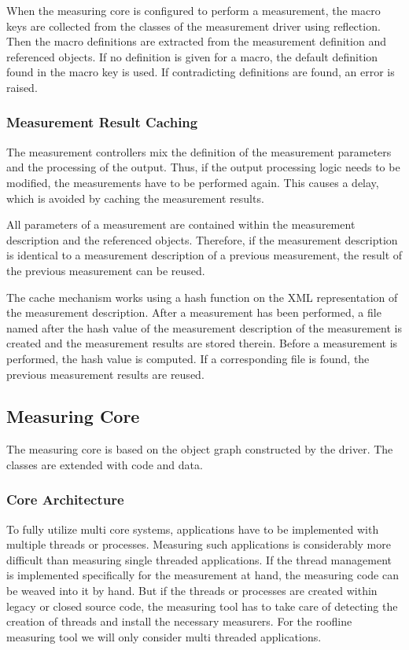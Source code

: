 \documentclass[a4paper,12pt]{article}
\newlength{\imgwidth}
\newcommand{\umlDiagram}[1]{%
	\settowidth{\imgwidth}{\texttt{[image: out/diagrams/\#1.pdf]}}%
	\setlength{\imgwidth}{\minof{0.5\imgwidth}{\textwidth}}%
	\par\vskip0.5cm\noindent\makebox[\textwidth][c]{%
	\texttt{[image: out/diagrams/\#1.pdf]}%
}\vskip0.5cm}
\begin{document}
When the measuring core is configured to perform a measurement, the macro keys
are collected from the classes of the measurement driver using reflection. Then
the macro definitions are extracted from the measurement definition and
referenced objects. If no definition is given for a macro, the default
definition found in the macro key is used. If contradicting definitions are
found, an error is raised.

\umlDiagram{measurementDriver/MacroDefinitions}

\subsubsection{Measurement Result Caching}
The measurement controllers mix the definition of the measurement parameters and
the processing of the output. Thus, if the output processing logic needs to be
modified, the measurements have to be performed again. This causes a delay,
which is avoided by caching the measurement results. 

All parameters of a measurement are contained within the measurement description
and the referenced objects. Therefore, if the measurement description is
identical to a measurement description of a previous measurement, the result of
the previous measurement can be reused. 

The cache mechanism works using a hash function on the XML representation of the
measurement description. After a measurement has been performed, a file named
after the hash value of the measurement description of the measurement is created
and the measurement results are stored therein. Before a measurement is
performed, the hash value is computed. If a corresponding file is found, the
previous measurement results are reused.

\subsection{Measuring Core}
The measuring core is based on the object graph constructed by the driver. The
classes are extended with code and data.

\subsubsection{Core Architecture}
To fully utilize multi core systems, applications have to be implemented with
multiple threads or processes. Measuring such applications is considerably more
difficult than measuring single threaded applications. If the thread management
is implemented specifically for the measurement at hand, the measuring code can
be weaved into it by hand. But if the threads or processes are created within
legacy or closed source code, the measuring tool has to take care of detecting
the creation of threads and install the necessary measurers. For the roofline
measuring tool we will only consider multi threaded applications.
\end{document}
